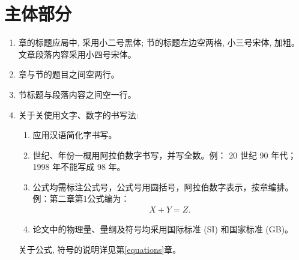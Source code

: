 \section{主体部分}
\begin{enumerate}
    \item 章的标题应局中, 采用小二号黑体; 节的标题左边空两格, 小三号宋体, 加粗。 文章段落内容采用小四号宋体。
    \item 章与节的题目之间空两行。
    \item 节标题与段落内容之间空一行。
    \item 关于关使用文字、数字的书写法:
        \begin{enumerate}
            \item 应用汉语简化字书写。
            \item 世纪、年份一概用阿拉伯数字书写，并写全数。例： 20 世纪 90 年代；1998 年不能写成 98 年。
            \item 公式均需标注公式号，公式号用圆括号，阿拉伯数字表示，按章编排。 \\
                例：第二章第1公式编为：
                \begin{equation}
                    \begin{aligned}
                        X + Y = Z.
                    \end{aligned}
                \end{equation}
            \item 论文中的物理量、量纲及符号均采用国际标准 (SI) 和国家标准 (GB)。
        \end{enumerate}
        关于公式, 符号的说明详见第\ref{equations}章。
\end{enumerate}
